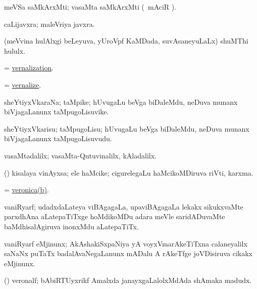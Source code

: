 \bentry
{}
\gl{\nA}
\expl{}
\bmng
 meVSa saMkArxMti; vasaMta saMkArxMti (\su\ mAciR ). 
\emng
\eentry

\bentry
{}
\gl{\nA}
\expl{}
\bmng
 caLijavxra; maleVriya javxra. 
\emng
\eentry

\bentry
{} 
\gl{\nA}
\expl{}
\bmng
 (meVvina hulAlxgi beLeyuva, yUroVpf KaMDada, suvAsaneyuLaLx) shuMThi hululx. 
\emng
\eentry

\bentry
{} 
\gl{\nA}
\expl{}
\bmng
 = \hyperlink{vernalization}{vernalization}. 
\emng
\eentry

\bentry
{} 
\gl{\sakirx}
\expl{}
\bmng
 = \hyperlink{vernalize}{vernalize}. 
\emng
\eentry

\bentry
{} 
\gl{\nA}
\expl{}
\bmng
 sheYtiyxVkaraNa; taMpike; hUvugaLu beVga biDaleMdu, neDuva munanx biVjagaLanunx taMpugoLisuvike. 
\emng
\eentry

\bentry
{} 
\gl{\sakirx}
\expl{}
\bmng
 sheYtiyxVkarisu; taMpugoLisu; hUvugaLu beVga biDaleMdu, neDuva munanx biVjagaLanunx taMpugoLisuvudu. 
\emng
\eentry

\bentry
{} 
\gl{\kirxvi}
\expl{}
\bmng
 vasaMtadalilx; vasaMta-Qutuvinalilx, kAladalilx. 
\emng
\eentry

\bentry
{} 
\gl{\nA}
\expl{}
\bmng
 (\savi) kisalaya vinAyxsa; ele haMcike; cigurelegaLu haMcikoMDiruva riVti, karxma. 
\emng
\eentry

\bentry
{} 
\gl{\nA}
\expl{}
\bmng
 = \hyperlink{veronica(b)}{veronica(b)}. 
\emng
\eentry

\bentry
{} 
\gl{\nA}
\expl{}
\bmng
 vaniRyarf; udadxdaLateya viBAgagaLa, upaviBAgagaLa lekakx sikukxvaMte parxdhAna aLatepaTiTxge hoMdikoMDu adara meVle saridADuvaMte baMdhisalAgiruva inonxMdu aLatepaTiTx. 
\emng
\eentry

\bentry 
{}
\gl{\nA}
\expl{}
\bmng
 vaniRyarf eMjinunx; AkAshakiSxpaNiya yA voyxVmarAkeTiTxna calaneyalilx saNaNx puTaTx badalAvaNegaLanunx mADalu A rAkeTfge joVDisiruva cikakx eMjinunx. 
\emng
\eentry

\bentry
{} 
\gl{\nA}
\expl{}
\bmng
 (\ravi) veronalf; bAbiRTUyxrikf Amalxda janayxgaLalolxMdAda shAmaka madudx. 
\emng
\eentry

